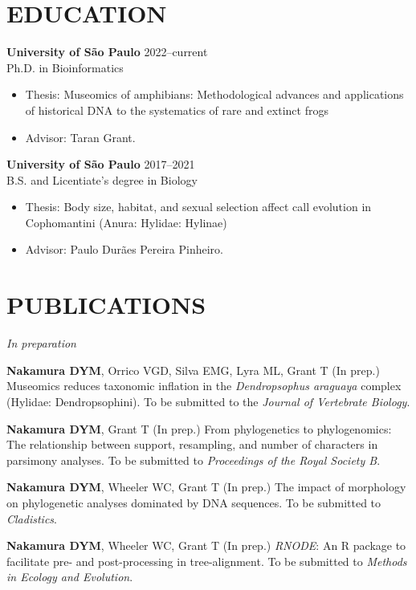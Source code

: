 \documentclass[margin, 10pt]{res} %
\begin{document}
\begin{resume}
 
\section{EDUCATION}

\textbf{University of São Paulo} \hfill 2022--current \\
Ph.D. in Bioinformatics
\begin{itemize}
\item Thesis: Museomics of amphibians: Methodological advances and applications of historical DNA to the systematics of rare and extinct frogs
\item Advisor: Taran Grant.
\end{itemize} 

\textbf{University of São Paulo} \hfill 2017--2021 \\
B.S. and Licentiate's degree in Biology
\begin{itemize}
\item Thesis: Body size, habitat, and sexual selection affect call evolution in Cophomantini (Anura: Hylidae: Hylinae)
\item Advisor: Paulo Durães Pereira Pinheiro.
\end{itemize} 


\section{PUBLICATIONS}
{\sl In preparation}
\begin{etaremune}
\item \textbf{Nakamura DYM}, Orrico VGD, Silva EMG, Lyra ML, Grant T (In prep.) Museomics reduces taxonomic inflation in the \emph{Dendropsophus araguaya} complex (Hylidae: Dendropsophini). To be submitted to the \emph{Journal of Vertebrate Biology}.
\item \textbf{Nakamura DYM}, Grant T (In prep.) From phylogenetics to phylogenomics: The relationship between support, resampling, and number of characters in parsimony analyses. To be submitted to \emph{Proceedings of the Royal Society B}. 
\item \textbf{Nakamura DYM}, Wheeler WC, Grant T (In prep.) The impact of morphology on phylogenetic analyses dominated by DNA sequences. To be submitted to \emph{Cladistics}. 
\item \textbf{Nakamura DYM}, Wheeler WC, Grant T (In prep.) \emph{RNODE}: An R package to facilitate pre- and post-processing in tree-alignment. To be submitted to \emph{Methods in Ecology and Evolution}. 
\end{etaremune}


\end{resume}
\end{document}
